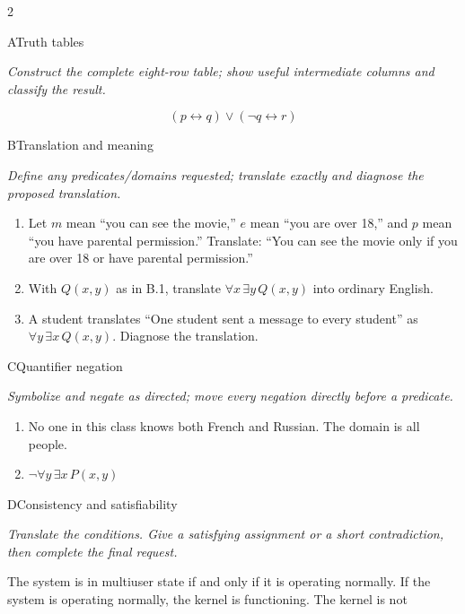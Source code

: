 \documentclass[9pt]{extarticle}
\begin{document}
\CoreWorkArea
\FormBreak
{}
\begin{multicols}{2}
\begin{CoreProblem}{A}{Truth tables}
{\scriptsize\textit{Construct the complete eight-row table; show useful intermediate columns and classify the result.}\par}
\[
  (p\leftrightarrow q)\lor(\neg q\leftrightarrow r)
\]
\end{CoreProblem}
\begin{CoreProblem}{B}{Translation and meaning}
{\scriptsize\textit{Define any predicates/domains requested; translate exactly and diagnose the proposed translation.}\par}
\begin{enumerate}[label=(\alph*)]
  \item Let $m$ mean ``you can see the movie,'' $e$ mean ``you are over 18,''
        and $p$ mean ``you have parental permission.'' Translate: ``You can
        see the movie only if you are over 18 or have parental permission.''
  \item With $Q(x,y)$ as in B.1, translate $\forall x\,\exists y\,Q(x,y)$
        into ordinary English.
  \item A student translates ``One student sent a message to every student''
        as $\forall y\,\exists x\,Q(x,y)$. Diagnose the translation.
\end{enumerate}
\end{CoreProblem}
\begin{CoreProblem}{C}{Quantifier negation}
{\scriptsize\textit{Symbolize and negate as directed; move every negation directly before a predicate.}\par}
\begin{enumerate}[label=(\alph*)]
  \item No one in this class knows both French and Russian. The domain is all
        people.
  \item $\neg\forall y\,\exists x\,P(x,y)$
\end{enumerate}
\end{CoreProblem}
\columnbreak
\begin{CoreProblem}{D}{Consistency and satisfiability}
{\scriptsize\textit{Translate the conditions. Give a satisfying assignment or a short contradiction, then complete the final request.}\par}
The system is in multiuser state if and only if it is operating normally. If
the system is operating normally, the kernel is functioning. The kernel is not

\end{CoreProblem}
\end{multicols}
\end{document}
